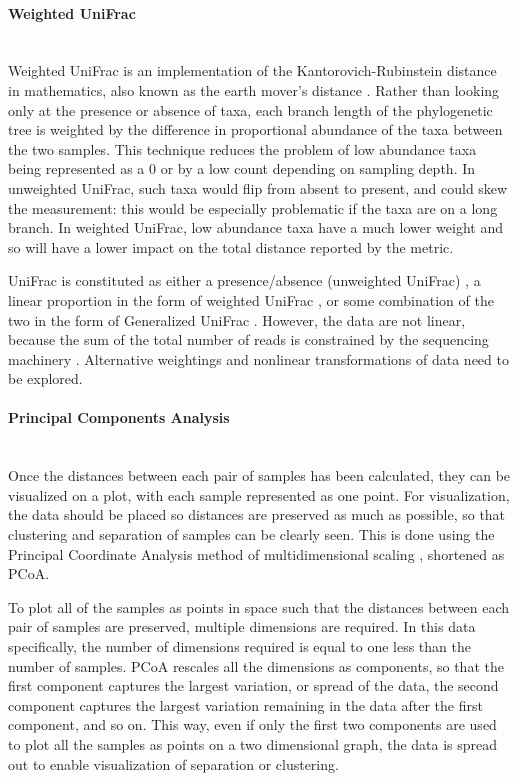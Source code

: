 \FloatBarrier

\paragraph{Weighted UniFrac}\mbox{}\\
Weighted UniFrac is an implementation of the Kantorovich-Rubinstein distance in mathematics, also known as the earth mover's distance \cite{evans2012phylogenetic}. Rather than looking only at the presence or absence of taxa, each branch length of the phylogenetic tree is weighted by the difference in proportional abundance of the taxa between the two samples. This technique reduces the problem of low abundance taxa being represented as a 0 or by a low count depending on sampling depth. In unweighted UniFrac, such taxa would flip from absent to present, and could skew the measurement: this would be especially problematic if the taxa are on a long branch. In weighted UniFrac, low abundance taxa have a much lower weight and so will have a lower impact on the total distance reported by the metric.

UniFrac is constituted as either a presence/absence (unweighted UniFrac) \cite{lozupone2005unifrac}, a linear proportion in the form of weighted UniFrac \cite{lozupone2007quantitative}, or some combination of the two in the form of Generalized UniFrac \cite{chen2012associating}. However, the data are not linear, because the sum of the total number of reads is constrained by the sequencing machinery \cite{friedman2012inferring}. Alternative weightings and nonlinear transformations of data need to be explored.

\paragraph{Principal Components Analysis}\mbox{}\\
Once the distances between each pair of samples has been calculated, they can be visualized on a plot, with each sample represented as one point. For visualization, the data should be placed so distances are preserved as much as possible, so that clustering and separation of samples can be clearly seen. This is done using the Principal Coordinate Analysis method of multidimensional scaling \cite{dollhopf2001interpreting}, shortened as PCoA.

To plot all of the samples as points in space such that the distances between each pair of samples are preserved, multiple dimensions are required. In this data specifically, the number of dimensions required is equal to one less than the number of samples. PCoA rescales all the dimensions as components, so that the first component captures the largest variation, or spread of the data, the second component captures the largest variation remaining in the data after the first component, and so on. This way, even if only the first two components are used to plot all the samples as points on a two dimensional graph, the data is spread out to enable visualization of separation or clustering.

